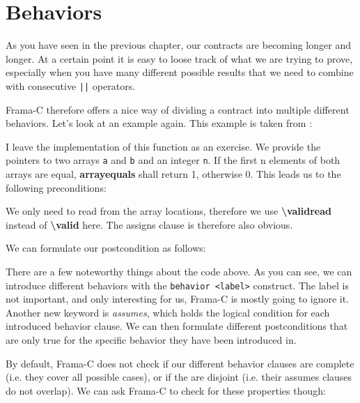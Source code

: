 \chapter{Behaviors}

As you have seen in the previous chapter, our contracts are becoming longer and longer. At a certain point it is easy to loose track of what we are trying to prove, especially when you have many different possible results that we need to combine with consecutive \texttt{||} operators. 

Frama-C therefore offers a nice way of dividing a contract into multiple different behaviors. Let's look at an example again. This example is taken from \cite{gerlach_acsl_2020}: 


I leave the implementation of this function as an exercise. We provide the pointers to two arrays \texttt{a} and \texttt{b} and an integer \texttt{n}. If the first n elements of both arrays are equal, \textbf{array\textunderscore equals} shall return 1, otherwise 0. This leads us to the following preconditions:


We only need to read from the array locations, therefore we use \textbf{\textbackslash valid\textunderscore read} instead of \textbf{\textbackslash valid} here. The assigns clause is therefore also obvious. 

We can formulate our postcondition as follows:


There are a few noteworthy things about the code above. As you can see, we can introduce different behaviors with the \texttt{behavior <label>} construct. The label is not important, and only interesting for us, Frama-C is mostly going to ignore it. Another new keyword is \emph{assumes}, which holds the logical condition for each introduced behavior clause. We can then formulate different postconditions that are only true for the specific behavior they have been introduced in. 

By default, Frama-C does not check if our different behavior clauses are complete (i.e. they cover all possible cases), or if the are disjoint (i.e. their assumes clauses do not overlap). We can ask Frama-C to check for these properties though: 


